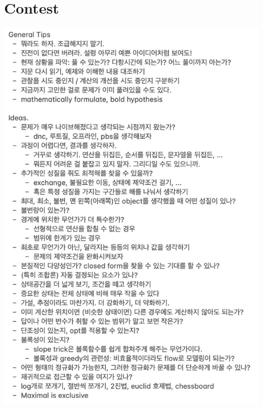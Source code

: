 \chapter{Contest}

\begin{minipage}{90mm}
\includegraphics[width=\textwidth]{content/contest/DecisionTree}
\end{minipage}
